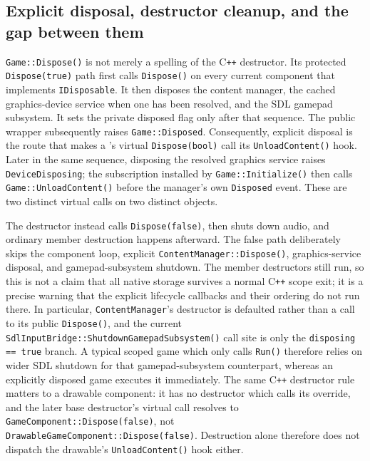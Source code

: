 \subsection{Explicit disposal, destructor cleanup, and the gap between them}

\texttt{Game::Dispose()} is not merely a spelling of the C\texttt{++} destructor. Its protected
\texttt{Dispose(true)} path first calls \texttt{Dispose()} on every current component that
implements \texttt{IDisposable}. It then disposes the content manager, the cached graphics-device
service when one has been resolved, and the SDL gamepad subsystem. It sets the private disposed
flag only after that sequence. The public wrapper subsequently raises \texttt{Game::Disposed}.
Consequently, explicit disposal is the route that makes a 's
virtual \texttt{Dispose(bool)} call its \texttt{UnloadContent()} hook. Later in the same sequence,
disposing the resolved graphics service raises \texttt{DeviceDisposing}; the subscription installed
by \texttt{Game::Initialize()} then calls \texttt{Game::UnloadContent()} before the manager's own
\texttt{Disposed} event. These are two distinct virtual calls on two distinct objects.

The destructor instead calls \texttt{Dispose(false)}, then shuts down audio, and ordinary member
destruction happens afterward. The false path deliberately skips the component loop, explicit
\texttt{ContentManager::Dispose()}, graphics-service disposal, and gamepad-subsystem shutdown.
The member destructors still run, so this is not a claim that all native storage survives a
normal C\texttt{++} scope exit; it is a precise warning that the explicit lifecycle callbacks and
their ordering do not run there. In particular, \texttt{ContentManager}'s destructor is defaulted
rather than a call to its public \texttt{Dispose()}, and the current
\texttt{SdlInputBridge::ShutdownGamepadSubsystem()} call site is only the \texttt{disposing ==
true} branch. A typical scoped game which only calls \texttt{Run()} therefore relies on wider SDL
shutdown for that gamepad-subsystem counterpart, whereas an explicitly disposed game executes it
immediately. The same C\texttt{++} destructor rule matters to a drawable component: it has no
destructor which calls its override, and the later  base destructor's
virtual call resolves to \texttt{GameComponent::Dispose(false)}, not
\texttt{DrawableGameComponent::Dispose(false)}. Destruction alone therefore does not dispatch the
drawable's \texttt{UnloadContent()} hook either.

